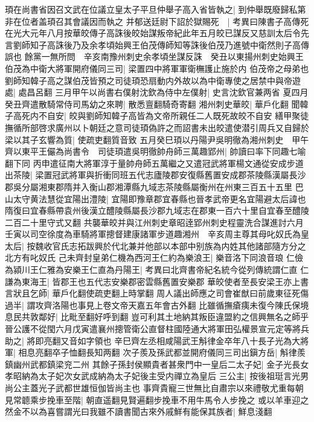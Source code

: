 頊在尚書省因召文武在位議立皇太子平旦仲舉子高入省皆執之|{
	到仲舉既廢歸私第非在位者盖頊召其會議因而執之}
并郁送廷尉下詔於獄賜死　|{
	考異曰陳書子高傳死在光大元年八月按華皎傳子高誅後皎始謀叛帝紀此年五月皎已謀反又慈訓太后令先言劉師知子高誅後乃及余孝頃始興王伯茂傳師知等誅後伯茂乃進號中衛然則子高傳誤也}
餘黨一無所問　辛亥南豫州刺史余孝頃坐謀反誅　癸丑以東揚州刺史始興王伯茂為中衛大將軍開府儀同三司|{
	梁置四中將軍軍衛橅護止施於内}
伯茂帝之母弟也劉師知韓子高之謀伯茂皆預之司徒頊恐扇動内外故以為中衛專使之居禁中與帝遊處|{
	處昌呂翻}
三月甲午以尚書右僕射沈欽為侍中左僕射|{
	史言沈欽官兼两省}
夏四月癸丑齊遣散騎常侍司馬幼之來聘|{
	散悉亶翻騎奇寄翻}
湘州刺史華皎|{
	華戶化翻}
聞韓子高死内不自安|{
	皎與劉師知韓子高皆為文帝所親任二人既死故皎不自安}
繕甲聚徒撫循所部啓求廣州以卜朝廷之意司徒頊偽許之而詔書未出皎遣使潜引周兵又自歸於梁以其子玄響為質|{
	使疏吏翻質音致}
五月癸巳頊以丹陽尹吳明徹為湘州刺史　甲午齊以東平王儼為尚書令　司徒頊遣吳明徹帥舟師三萬趣郢州|{
	帥讀曰率下同趣七喻翻下同}
丙申遣征南大將軍淳于量帥舟師五萬繼之又遣冠武將軍楊文通從安成步道出茶陵|{
	梁置冠武將軍與折衝同班五代志廬陵郡安復縣舊置安成郡茶陵縣漢屬長沙郡吳分屬湘東郡隋并入衡山郡湘潭縣九域志茶陵縣屬衡州在州東三百五十五里}
巴山太守黄法慧從宜陽出澧陵|{
	宜陽即豫章郡宜春縣也晉孝武帝更名宜陽避太后諱也隋復曰宜春縣帶袁州後漢立醴陵縣屬長沙郡九域志在郡東一百六十里自宜春至醴陵二百二十里守式又翻}
共襲華皎并與江州刺史章昭逹郢州刺史程靈洗合謀進討六月壬寅以司空徐度為車騎將軍摠督建康諸軍步道趣湘州　辛亥周主尊其母叱奴氏為皇太后|{
	按魏收官氏志拓跋興於代北兼并他部以本部中别族為内姓其他諸部隨方分之北方有叱奴氏}
己未齊封皇弟仁機為西河王仁約為樂浪王|{
	樂音洛下同浪音琅}
仁儉為潁川王仁雅為安樂王仁直為丹陽王|{
	考異曰北齊書帝紀名統今從列傳統謂仁直}
仁謙為東海王|{
	皆郡王也五代志安樂郡密雲縣舊置安樂郡}
華皎使者至長安梁王亦上書言狀且乞師|{
	華戶化翻使疏吏翻上時掌翻}
周人議出師應之司會崔猷曰前歲東征死傷過半|{
	謂攻齊洛陽也事見上卷文帝天嘉五年會古外翻}
比雖循撫瘡痍未復今陳氏保境息民共敦鄰好|{
	比毗至翻好呼到翻}
豈可利其土地納其叛臣違盟約之信興無名之師乎晉公護不從閠六月戊寅遣襄州摠管衛公直督柱國陸通大將軍田弘權景宣元定等將兵助之|{
	將即亮翻又音如字領也}
辛巳齊左丞相咸陽武王斛律金卒年八十長子光為大將軍|{
	相息亮翻卒子恤翻長知两翻}
次子羨及孫武都並開府儀同三司出鎭方岳|{
	斛律羨鎮幽州武都鎮梁兖二州}
其餘子孫封侯顯貴者甚衆門中一皇后二太子妃|{
	金子光長女孝昭納為太子妃次女武成納為太子妃後主受内禪立為皇后}
三公主|{
	按後祖珽言光男尚公主蓋光子武都世雄恒伽皆尚主也}
事齊貴寵三世無比自肅宗以來禮敬尤重每朝見常聼乘步挽車至階|{
	朝直遥翻見賢遍翻步挽車不用牛馬令人步挽之}
或以羊車迎之然金不以為喜嘗謂光曰我雖不讀書聞古來外戚鮮有能保其族者|{
	鮮息淺翻}

